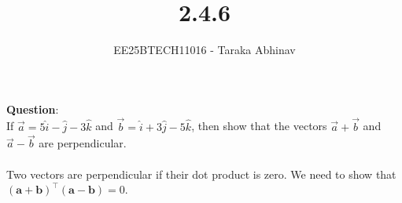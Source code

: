 \documentclass[journal]{IEEEtran}
\begin{document}


\title{2.4.6}
\author{EE25BTECH11016 - Taraka Abhinav}
{\let\newpage\relax\maketitle}

\renewcommand{\thefigure}{\theenumi}
\renewcommand{\thetable}{\theenumi}
\setlength{\intextsep}{10pt}

\renewcommand{\thetable}{\theenumi}

\textbf{Question}:\\
If $\vec{a} = 5\hat{i} - \hat{j} - 3\hat{k}$ and $\vec{b} = \hat{i} + 3\hat{j} - 5\hat{k}$, then show that the vectors $\vec{a} + \vec{b}$ and $\vec{a} - \vec{b}$ are perpendicular. \\

\solution \\

Two vectors are perpendicular if their dot product is zero. We need to show that $(\mathbf{a} + \mathbf{b})^\top (\mathbf{a} - \mathbf{b}) = 0$.
\end{document}
